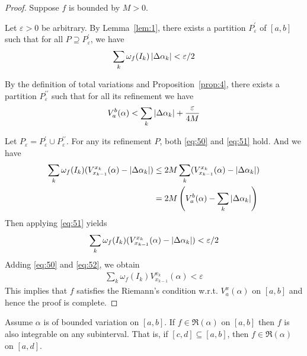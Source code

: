 \documentclass[thmcnt=section, color=blue, 12pt]{my-elegantbook}
\begin{document}
\begin{proof}
	Suppose $f$ is bounded by $M > 0$.

	Let $\varepsilon > 0$ be arbitrary.
	By Lemma~\ref{lem:1}, there exists a partition $P^\prime_\varepsilon$ of $[a, b]$
	such that for all $P \supseteq P^\prime_\varepsilon$,
	we have
	\begin{align}
		\sum_{k} \omega_f(I_k) \left\lvert \Delta \alpha_k \right\rvert < \varepsilon / 2
		\label{eq:50}
	\end{align}

	By the definition of total variations and Proposition~\ref{prop:4},
	there exists a partition $P^{\prime\prime}_\varepsilon$ such that
	for all its refinement we have
	\begin{align}
		V_a^b(\alpha) < \sum_{k} \left\lvert \Delta \alpha_k \right\rvert + \frac{\varepsilon}{4M}
		\label{eq:51}
	\end{align}

	Let $P_\varepsilon = P^\prime_\varepsilon \cup P^{\prime\prime}_\varepsilon$.
	For any its refinement $P$, both \eqref{eq:50} and \eqref{eq:51} hold.
	And we have
	\begin{align*}
		\sum_{k} \omega_f(I_k) (V_{x_{k-1}}^{x_k}(\alpha) - \left\lvert \Delta \alpha_k \right\rvert)
		 & \leq 2M \sum_{k} (V_{x_{k-1}}^{x_k}(\alpha) - \left\lvert \Delta \alpha_k \right\rvert) \\
		 & = 2M \left( V_a^b(\alpha) - \sum_{k} \left\lvert \Delta \alpha_k \right\rvert \right)
	\end{align*}
	Then applying \eqref{eq:51} yields
	\begin{align}
		\sum_{k} \omega_f(I_k) (V_{x_{k-1}}^{x_k}(\alpha) - \left\lvert \Delta \alpha_k \right\rvert)
		< \varepsilon / 2
		\label{eq:52}
	\end{align}
	Adding \eqref{eq:50} and \eqref{eq:52}, we obtain
	\begin{align*}
		\sum_{k} \omega_f(I_k) V_{x_{k-1}}^{x_k}(\alpha)
		< \varepsilon
	\end{align*}
	This implies that $f$ satisfies the Riemann's condition w.r.t. $V_a^x(\alpha)$
	on $[a, b]$ and hence the proof is complete.
\end{proof}

\begin{theorem} \label{thm:13}
	Assume $\alpha$ is of bounded variation on $[a, b]$.
	If $f \in \mathfrak{R}(\alpha)$ on $[a, b]$
	then $f$ is also integrable on any subinterval.
	That is, if $[c, d] \subseteq [a, b]$,
	then $f \in \mathfrak{R}(\alpha)$ on $[a, d]$.
\end{theorem}
\end{document}
